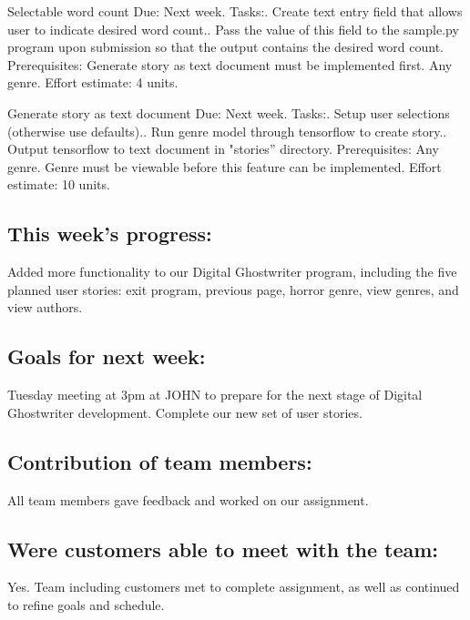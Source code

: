 \documentclass[12pt]{article}
\begin{document}
Selectable word count\newline
Due: Next week.\newline
Tasks:. Create text entry field that allows user to indicate desired word count.. Pass the value of this field to the sample.py program upon submission so\newline
that the output contains the desired word count.\newline
Prerequisites:\newline
Generate story as text document must be implemented first.\newline
Any genre.\newline
Effort estimate: 4 units.

Generate story as text document\newline
Due: Next week.\newline
Tasks:. Setup user selections (otherwise use defaults).. Run genre model through tensorflow to create story.. Output tensorflow to text document in "stories” directory. Prerequisites:\newline
Any genre.\newline
Genre must be viewable before this feature can be implemented.\newline
Effort estimate: 10 units.

\subsection{This week's progress:}
Added more functionality to our Digital Ghostwriter program, including the five planned user stories: exit program, previous page, horror genre, view genres, and view authors.

\subsection{Goals for next week:}
Tuesday meeting at 3pm at JOHN to prepare for the next stage of Digital Ghostwriter development. Complete our new set of user stories. 

\subsection{Contribution of team members:}
All team members gave feedback and worked on our assignment.

\subsection{Were customers able to meet with the team:}
Yes. Team including customers met to complete assignment, as well as continued to refine goals and schedule. 
\end{document}
